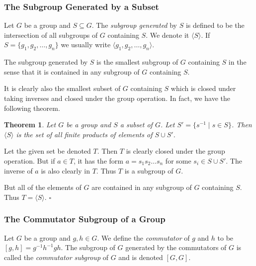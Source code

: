 \documentclass[10pt]{article}
\newtheorem{theorem}{Theorem}[section]
\newenvironment{proof}[1][Proof]{\begin{trivlist}
\item[\hskip \labelsep {\itshape #1}]}{\end{trivlist}}
\newenvironment{definition}[1][Definition]{\begin{trivlist}
\item[\hskip \labelsep {\bfseries #1}]}{\end{trivlist}}
\begin{document}
\subsubsection{The Subgroup Generated by a Subset}

\begin{definition}
Let $G$ be a group and $S \subseteq G$. The \emph{subgroup generated} by $S$ is defined to be the intersection of all subgroups of $G$ containing $S$. We denote it $\langle S \rangle$. If $S = \{g_1, g_2, \ldots, g_n\}$ we usually write $\langle g_1, g_2, \ldots, g_n \rangle$.
\end{definition}

The subgroup generated by $S$ is the smallest subgroup of $G$ containing $S$ in the sense that it is contained in any subgroup of $G$ containing $S$.

It is clearly also the smallest subset of $G$ containing $S$ which is closed under taking inverses and closed under the group operation. In fact, we have the following theorem.

\begin{theorem}
Let $G$ be a group and $S$ a subset of $G$. Let $S' = \{s^{-1} \;|\; s \in S\}$. Then $\langle S \rangle$ is the set of all finite products of elements of $S \cup S'$.
\end{theorem}

\begin{proof}
Let the given set be denoted $T$. Then $T$ is clearly closed under the group operation. But if $a \in T$, it has the form $a = s_1s_2\ldots s_n$ for some $s_i \in S\cup S'$. The inverse of $a$ is also clearly in $T$. Thus $T$ is a subgroup of $G$.

But all of the elements of $G$ are contained in any subgroup of $G$ containing $S$. Thus $T = \langle S \rangle$. $\square$
\end{proof}

\subsubsection{The Commutator Subgroup of a Group}

\begin{definition}
Let $G$ be a group and $g, h \in G$. We define the \emph{commutator} of $g$ and $h$ to be $[g, h] = g^{-1}h^{-1}gh$. The subgroup of $G$ generated by the commutators of $G$ is called the \emph{commutator subgroup} of $G$ and is denoted $[G, G]$.
\end{definition}
\end{document}
